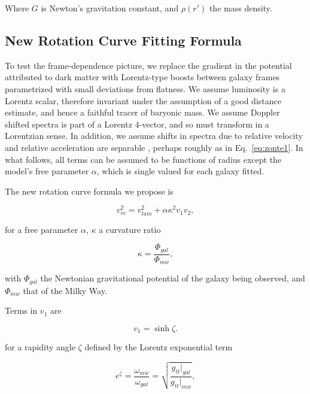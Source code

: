 \documentclass[reprint,%
 amsmath,amssymb,
 aps,
]{revtex4-1}
\begin{document}
 Where $G$ is Newton's   gravitation constant, and 
$\rho(r')$  the mass density. 
  



\subsection{New Rotation Curve Fitting Formula}

  

 

 To test the   
frame-dependence picture, 
we  replace the gradient in the potential attributed to   dark matter      with  Lorentz-type boosts between galaxy frames parametrized with small deviations from flatness.   We    assume  luminosity   is a Lorentz scalar, therefore invariant under the assumption of a good distance estimate, and hence a faithful tracer of baryonic mass. 
We assume   
   Doppler shifted spectra is part of a Lorentz 4-vector, and so    must transform in a Lorentzian sense.
In addition, we 
   assume   shifts in   spectra   due to relative velocity and relative acceleration are separable \cite{Jack,Cisn}, perhaps roughly  as in Eq.~\ref{eq:zonte1}. 
   In what follows, all   terms  can be assumed to  be functions of radius except the model's free parameter $\alpha$,  which is single valued for each galaxy fitted. 
   
   The new rotation curve formula we propose  is
   

\begin{equation}
v_{rc}^2 =  v_{lum}^2+\alpha \kappa^2 v_{1} v_{2},  
\label{eq:zonteLCM}
\end{equation}  

for   a free parameter $\alpha$,  
$\kappa$  a curvature ratio 

 \begin{equation}
\kappa=\frac{\Phi_{gal}}{\Phi_{mw}}, 
\label{eq:kappa2}  
\end{equation}  

 with $\Phi_{gal}$ the    Newtonian gravitational potential of the galaxy being observed, and $\Phi_{mw}$ that of  the Milky Way. 


 Terms in $v_1$   are   
 
   \begin{equation}
       v_1 = \sinh \zeta. 
   \end{equation}
 
 for a rapidity angle $\zeta$ defined by the    Lorentz exponential  term  
  
   
     \begin{equation}
     e^{\zeta}=  \frac{\omega_{mw}}{\omega_{gal}}  =\sqrt{\frac{g_{tt}|_{gal}}{g_{tt}|_{mw}}},
      \label{eq:gravRS}
    \end{equation}
    
\end{document}
